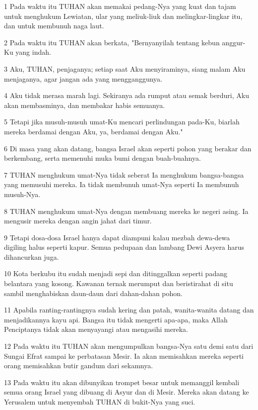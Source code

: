 \par 1 Pada waktu itu TUHAN akan memakai pedang-Nya yang kuat dan tajam untuk menghukum Lewiatan, ular yang meliuk-liuk dan melingkar-lingkar itu, dan untuk membunuh naga laut.
\par 2 Pada waktu itu TUHAN akan berkata, "Bernyanyilah tentang kebun anggur-Ku yang indah.
\par 3 Aku, TUHAN, penjaganya; setiap saat Aku menyiraminya, siang malam Aku menjaganya, agar jangan ada yang mengganggunya.
\par 4 Aku tidak merasa marah lagi. Sekiranya ada rumput atau semak berduri, Aku akan membasminya, dan membakar habis semuanya.
\par 5 Tetapi jika musuh-musuh umat-Ku mencari perlindungan pada-Ku, biarlah mereka berdamai dengan Aku, ya, berdamai dengan Aku."
\par 6 Di masa yang akan datang, bangsa Israel akan seperti pohon yang berakar dan berkembang, serta memenuhi muka bumi dengan buah-buahnya.
\par 7 TUHAN menghukum umat-Nya tidak seberat Ia menghukum bangsa-bangsa yang memusuhi mereka. Ia tidak membunuh umat-Nya seperti Ia membunuh musuh-Nya.
\par 8 TUHAN menghukum umat-Nya dengan membuang mereka ke negeri asing. Ia mengusir mereka dengan angin jahat dari timur.
\par 9 Tetapi dosa-dosa Israel hanya dapat diampuni kalau mezbah dewa-dewa digiling halus seperti kapur. Semua pedupaan dan lambang Dewi Asyera harus dihancurkan juga.
\par 10 Kota berkubu itu sudah menjadi sepi dan ditinggalkan seperti padang belantara yang kosong. Kawanan ternak merumput dan beristirahat di situ sambil menghabiskan daun-daun dari dahan-dahan pohon.
\par 11 Apabila ranting-rantingnya sudah kering dan patah, wanita-wanita datang dan menjadikannya kayu api. Bangsa itu tidak mengerti apa-apa, maka Allah Penciptanya tidak akan menyayangi atau mengasihi mereka.
\par 12 Pada waktu itu TUHAN akan mengumpulkan bangsa-Nya satu demi satu dari Sungai Efrat sampai ke perbatasan Mesir. Ia akan memisahkan mereka seperti orang memisahkan butir gandum dari sekamnya.
\par 13 Pada waktu itu akan dibunyikan trompet besar untuk memanggil kembali semua orang Israel yang dibuang di Asyur dan di Mesir. Mereka akan datang ke Yerusalem untuk menyembah TUHAN di bukit-Nya yang suci.

